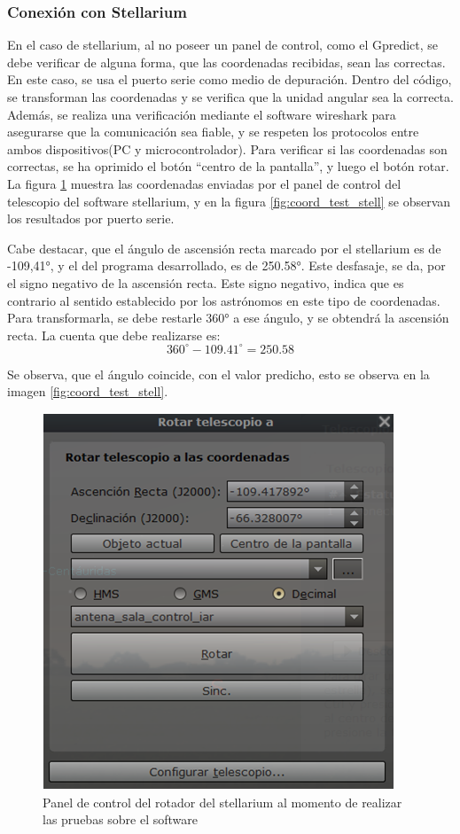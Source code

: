 \subsubsection{Conexión con Stellarium} 

En el caso de stellarium, al no poseer un panel de control, como el Gpredict, se debe verificar de alguna forma, que las coordenadas recibidas, sean las correctas. En este caso, se usa el puerto serie como medio de depuración. Dentro del código, se transforman las coordenadas y se verifica que la unidad angular sea la correcta. Además, se realiza una verificación mediante el software wireshark para asegurarse que la comunicación sea fiable, y se respeten los protocolos entre ambos dispositivos(PC y microcontrolador).
Para verificar si las coordenadas son correctas, se ha oprimido el botón ``centro de la pantalla'', y luego el botón rotar. La figura \ref{fig:rotador_antena_stell_test} muestra las coordenadas enviadas por el panel de control del telescopio del software stellarium, y en la figura \ref{fig:coord_test_stell} se observan los resultados por puerto serie. 

Cabe destacar, que el ángulo de ascensión recta marcado por el stellarium es de -109,41°, y el del programa desarrollado, es de 250.58°. Este desfasaje, se da, por el signo negativo de la ascensión recta. Este signo negativo, indica que es contrario al sentido establecido por los astrónomos en este tipo de coordenadas. Para transformarla, se debe restarle 360° a ese ángulo, y se obtendrá la ascensión recta. La cuenta que debe realizarse es: 
\begin{equation*}
	360^\circ - 109.41^\circ = 250.58 
\end{equation*}

 Se observa, que el ángulo coincide, con el valor predicho, esto se observa en la imagen \ref{fig:coord_test_stell}.  
\begin{figure}[ht!]
	\includegraphics{rotador_antena_stell} 
	\caption{Panel de control del rotador del stellarium al momento de realizar las pruebas sobre el software} 
	\label{fig:rotador_antena_stell_test}
\end{figure}

